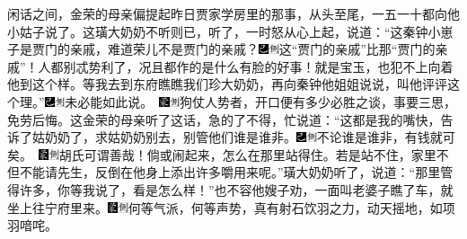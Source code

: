 闲话之间，金荣的母亲偏提起昨日贾家学房里的那事，从头至尾，一五一十都向他小姑子说了。这璜大奶奶不听则已，听了，一时怒从心上起，说道：“这秦钟小崽子是贾门的亲戚，难道荣儿不是贾门的亲戚？{\includegraphics[width=3mm]{../Images/00003}\includegraphics[width=3mm]{../Images/00011}\footnotesize \kaishu 这“贾门的亲戚”比那“贾门的亲戚”！}人都别忒势利了，况且都作的是什么有脸的好事！就是宝玉，也犯不上向着他到这个样。等我去到东府瞧瞧我们珍大奶奶，再向秦钟他姐姐说说，叫他评评这个理。”{\includegraphics[width=3mm]{../Images/00003}\includegraphics[width=3mm]{../Images/00011}\footnotesize \kaishu 未必能如此说。　\includegraphics[width=3mm]{../Images/00006}\includegraphics[width=3mm]{../Images/00011}\footnotesize \kaishu 狗仗人势者，开口便有多少必胜之谈，事要三思，免劳后悔。}这金荣的母亲听了这话，急的了不得，忙说道：“这都是我的嘴快，告诉了姑奶奶了，求姑奶奶别去，别管他们谁是谁非。{\includegraphics[width=3mm]{../Images/00003}\includegraphics[width=3mm]{../Images/00011}\footnotesize \kaishu 不论谁是谁非，有钱就可矣。　\includegraphics[width=3mm]{../Images/00006}\includegraphics[width=3mm]{../Images/00011}\footnotesize \kaishu 胡氏可谓善哉！}倘或闹起来，怎么在那里站得住。若是站不住，家里不但不能请先生，反倒在他身上添出许多嚼用来呢。”璜大奶奶听了，说道：“那里管得许多，你等我说了，看是怎么样！”也不容他嫂子劝，一面叫老婆子瞧了车，就坐上往宁府里来。{\includegraphics[width=3mm]{../Images/00006}\includegraphics[width=3mm]{../Images/00011}\footnotesize \kaishu 何等气派，何等声势，真有射石饮羽之力，动天摇地，如项羽喑咤。}

